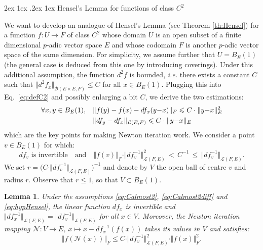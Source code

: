 \documentclass[11pt]{article}
\makeatletter
\numberwithin{equation}{section}
\numberwithin{figure}{section}
\renewcommand\paragraph{\@startsection{paragraph}{4}{\z@}%
                                    {2ex \@plus1ex \@minus.2ex}%
                                    {1ex}%
                                    {\normalfont\normalsize\bfseries}}
\renewcommand{\leq}{\leqslant}
\newtheorem{lem}[theo]{Lemma}
\theoremstyle{definition}
\newcommand{\calB}{\mathcal B}
\newcommand{\calL}{\mathcal L}
\newcommand{\calN}{\mathcal N}
\makeatother
\begin{document}
\paragraph{Hensel's Lemma for functions of class $C^2$}

We want to develop an analogue of Hensel's Lemma (see Theorem 
\ref{th:Hensel}) for a function $f : U \to F$ of class $C^2$ whose 
domain $U$ is an open subset of a finite dimensional $p$-adic vector 
space $E$ and whose codomain $F$ is another $p$-adic vector space of the same 
dimension. For simplicity, we assume further that $U = B_E(1)$ (the
general case is deduced from this one by introducing coverings).
Under this additional assumption, the function $d^2 f$ is bounded, 
\emph{i.e.} there exists a constant $C$ such that
$\Vert d^2 f_x \Vert_{\calB(E{\times}E, F)} \leq C$ for all $x \in B_E(1)$.
Plugging this into Eq.~\eqref{eq:defC2} and possibly enlarging a bit
$C$, we derive the two estimations:
\begin{align}
\forall x, y \in B_E(1), \quad 
& \Vert f(y) - f(x) - df_x(y{-}x) \Vert_F \leq 
  C \cdot \Vert y{-}x \Vert_E^2 \label{eq:Calmost2} \medskip \\
& \Vert df_y - df_x \Vert_{\calL(E,F)} \leq 
  C \cdot \Vert y{-}x \Vert_E \label{eq:Calmost2diff}
\end{align}
which are the key points for making Newton iteration work. 
We consider a point $v \in B_E(1)$ for which:
\begin{equation}
\label{eq:hypHensel}
df_v \text{ is invertible}
\quad \text{and} \quad
\Vert f(v) \Vert_F \cdot \Vert df_v^{-1} \Vert_{\calL(F,E)}^2 
\,<\, C^{-1} \,\leq\, 
\Vert df_v^{-1} \Vert_{\calL(F,E)}.
\end{equation}
We set $r = \big(C \cdot \Vert df_v^{-1} \Vert_{\calL(F,E)}\big)^{-1}$ 
and denote by $V$ the open ball of centre $v$ and radius $r$. Observe
that $r \leq 1$, so that $V \subset B_E(1)$.

\begin{lem}
\label{lem:HenselC2}
Under the assumptions \eqref{eq:Calmost2}, \eqref{eq:Calmost2diff}
and \eqref{eq:hypHensel}, the linear function $df_x$ is invertible
and $\Vert df_x^{-1} \Vert_{\calL(F,E)} = \Vert df_v^{-1} \Vert_{\calL(F,E)}$
for all $x \in V$. Moreover, the Newton iteration mapping 
$\calN : V \to E$, $x \mapsto x - df_x^{-1}(f(x))$
takes its values in $V$ and satisfies:
\begin{equation}
\label{eq:estimNewton}
\Vert f(\calN(x)) \Vert_F \leq
C \cdot \Vert df_v^{-1} \Vert_{\calL(F,E)}^2 \cdot \Vert f(x) \Vert_F^2.
\end{equation}
\end{lem}
\end{document}
